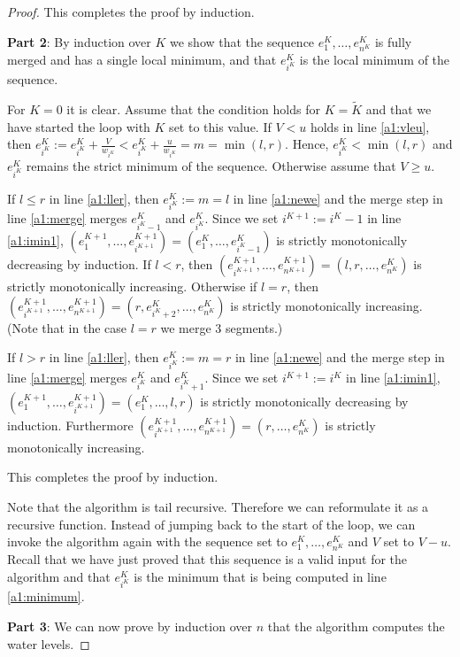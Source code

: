 \documentclass[11pt,a4paper]{article}
\begin{document}
\begin{proof}
This completes the proof by induction.

\textbf{Part 2}: By induction over $K$ we show that the sequence $e_1^K,\ldots,e_{n^K}^K$ is fully merged and has a single local minimum, and that $e_{i^K}^K$ is the local minimum of the sequence.

For $K=0$ it is clear.
Assume that the condition holds for $K = \tilde{K}$ and that we have started the loop with $K$ set to this value.
If $V < u$ holds in line \ref{a1:vleu}, then $e_{i^K}^K := e_{i^K}^K + \frac{V}{w_{i^K}} < e_{i^K}^K + \frac{u}{w_{i^K}} = m = \min(l, r)$.
Hence, $e_{i^K}^K < \min(l, r)$ and $e_{i^K}^K$ remains the strict minimum of the sequence.
Otherwise assume that $V \ge u$.

If $l \le r$ in line \ref{a1:ller}, then $e_{i^K}^K := m = l$ in line \ref{a1:newe} and the merge step in line \ref{a1:merge} merges $e_{i^K - 1}^K$ and $e_{i^K}^K$.
Since we set $i^{K+1} := i^K - 1$ in line \ref{a1:imin1},
$(e_1^{K+1},\ldots,e_{i^{K+1}}^{K+1}) = (e_1^K,\ldots,e_{i^K - 1}^K)$ is strictly monotonically decreasing by induction.
If $l < r$, then $(e_{i^{K+1}}^{K+1},\ldots,e_{n^{K+1}}^{K+1}) = (l,r,\ldots,e_{n^K}^K)$ is strictly monotonically increasing.
Otherwise if $l = r$, then $(e_{i^{K+1}}^{K+1},\ldots,e_{n^{K+1}}^{K+1}) = (r,e_{i^K+2}^K,\ldots,e_{n^K}^K)$ is strictly monotonically increasing.
(Note that in the case $l = r$ we merge 3 segments.)

If $l > r$ in line \ref{a1:ller}, then $e_{i^K}^K := m = r$ in line \ref{a1:newe} and the merge step in line \ref{a1:merge} merges $e_{i^K}^K$ and $e_{i^K + 1}^K$.
Since we set $i^{K+1} := i^K$ in line \ref{a1:imin1},
$(e_1^{K+1},\ldots,e_{i^{K+1}}^{K+1}) = (e_1^K,\ldots,l,r)$ is strictly monotonically decreasing by induction.
Furthermore $(e_{i^{K+1}}^{K+1},\ldots,e_{n^{K+1}}^{K+1}) = (r,\ldots,e_{n^K}^K)$ is strictly monotonically increasing.

This completes the proof by induction.

Note that the algorithm is tail recursive.
Therefore we can reformulate it as a recursive function.
Instead of jumping back to the start of the loop, we can invoke the algorithm again with
the sequence set to $e_1^K,\ldots,e_{n^K}^K$ and $V$ set to $V - u$.
Recall that we have just proved that this sequence is a valid input for the algorithm and that $e_{i^K}^K$ is the minimum that is being computed in line \ref{a1:minimum}.

\textbf{Part 3}: We can now prove by induction over $n$ that the algorithm computes the water levels.


\end{proof}
\end{document}
